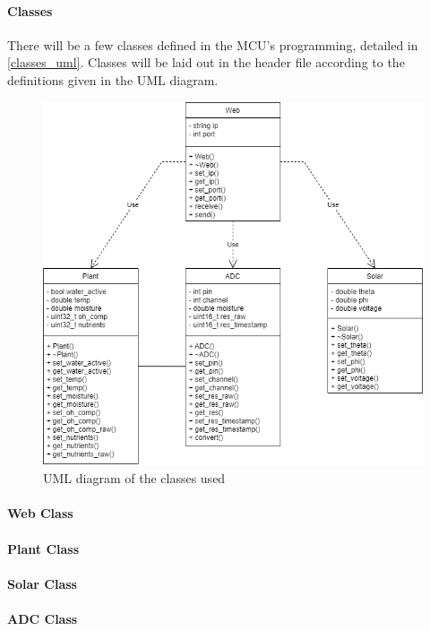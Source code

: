\paragraph{Classes}
There will be a few classes defined in the MCU's programming, detailed
in \autoref{classes_uml}. Classes will be laid out in the header file
according to the definitions given in the UML diagram.
\begin{figure}[H]
    \caption{UML diagram of the classes used}
    \label{classes_uml}
    \centering
    \includegraphics[width=\textwidth]{images/classes_uml.png}
\end{figure}

\paragraph{Web Class}

\paragraph{Plant Class}

\paragraph{Solar Class}

\paragraph{ADC Class}

